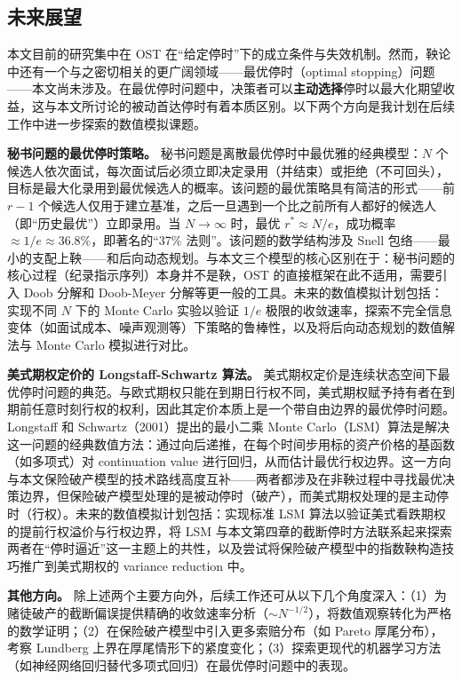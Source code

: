 \subsection{未来展望}

本文目前的研究集中在 OST 在``给定停时''下的成立条件与失效机制。然而，鞅论中还有一个与之密切相关的更广阔领域——最优停时（optimal stopping）问题——本文尚未涉及。在最优停时问题中，决策者可以\textbf{主动选择}停时以最大化期望收益，这与本文所讨论的被动首达停时有着本质区别。以下两个方向是我计划在后续工作中进一步探索的数值模拟课题。

\textbf{秘书问题的最优停时策略。} 秘书问题是离散最优停时中最优雅的经典模型：$N$ 个候选人依次面试，每次面试后必须立即决定录用（并结束）或拒绝（不可回头），目标是最大化录用到最优候选人的概率。该问题的最优策略具有简洁的形式——前 $r-1$ 个候选人仅用于建立基准，之后一旦遇到一个比之前所有人都好的候选人（即``历史最优''）立即录用。当 $N \to \infty$ 时，最优 $r^* \approx N/e$，成功概率 $\approx 1/e \approx 36.8\%$，即著名的``37\% 法则''。该问题的数学结构涉及 Snell 包络——最小的支配上鞅——和后向动态规划。与本文三个模型的核心区别在于：秘书问题的核心过程（纪录指示序列）本身并不是鞅，OST 的直接框架在此不适用，需要引入 Doob 分解和 Doob-Meyer 分解等更一般的工具。未来的数值模拟计划包括：实现不同 $N$ 下的 Monte Carlo 实验以验证 $1/e$ 极限的收敛速率，探索不完全信息变体（如面试成本、噪声观测等）下策略的鲁棒性，以及将后向动态规划的数值解法与 Monte Carlo 模拟进行对比。

\textbf{美式期权定价的 Longstaff-Schwartz 算法。} 美式期权定价是连续状态空间下最优停时问题的典范。与欧式期权只能在到期日行权不同，美式期权赋予持有者在到期前任意时刻行权的权利，因此其定价本质上是一个带自由边界的最优停时问题。Longstaff 和 Schwartz（2001）提出的最小二乘 Monte Carlo（LSM）算法是解决这一问题的经典数值方法：通过向后递推，在每个时间步用标的资产价格的基函数（如多项式）对 continuation value 进行回归，从而估计最优行权边界。这一方向与本文保险破产模型的技术路线高度互补——两者都涉及在非鞅过程中寻找最优决策边界，但保险破产模型处理的是被动停时（破产），而美式期权处理的是主动停时（行权）。未来的数值模拟计划包括：实现标准 LSM 算法以验证美式看跌期权的提前行权溢价与行权边界，将 LSM 与本文第四章的截断停时方法联系起来探索两者在``停时逼近''这一主题上的共性，以及尝试将保险破产模型中的指数鞅构造技巧推广到美式期权的 variance reduction 中。

\textbf{其他方向。} 除上述两个主要方向外，后续工作还可从以下几个角度深入：（1）为赌徒破产的截断偏误提供精确的收敛速率分析（$\sim N^{-1/2}$），将数值观察转化为严格的数学证明；（2）在保险破产模型中引入更多索赔分布（如 Pareto 厚尾分布），考察 Lundberg 上界在厚尾情形下的紧度变化；（3）探索更现代的机器学习方法（如神经网络回归替代多项式回归）在最优停时问题中的表现。
